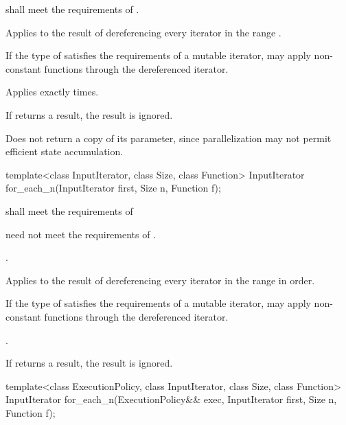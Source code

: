 \begin{itemdescr}
\pnum
\requires
{} shall meet the requirements of .

\pnum
\effects
Applies  to the result of dereferencing every iterator in the range
.
\begin{note}
If the type of  satisfies the requirements of a mutable iterator,
 may apply non-constant functions through the dereferenced iterator.
\end{note}

\pnum
\complexity
Applies  exactly  times.

\pnum
\remarks
If  returns a result, the result is ignored.

\pnum
\realnotes Does not return a copy of its  parameter, since
parallelization may not permit efficient state accumulation.
\end{itemdescr}

%
\begin{itemdecl}
template<class InputIterator, class Size, class Function>
  InputIterator for_each_n(InputIterator first, Size n, Function f);
\end{itemdecl}

\begin{itemdescr}
\pnum
\requires
{} shall meet the requirements of 
\begin{note}  need not meet the requirements of
. \end{note}

\pnum
\requires
{}.

\pnum
\effects
Applies  to the result of dereferencing every iterator in the range
 in order.
\begin{note}
If the type of  satisfies the requirements of a mutable iterator,
 may apply non-constant functions through the dereferenced iterator.
\end{note}

\pnum
\returns
{}.

\pnum
\remarks
If  returns a result, the result is ignored.
\end{itemdescr}

%
\begin{itemdecl}
template<class ExecutionPolicy, class InputIterator, class Size, class Function>
  InputIterator for_each_n(ExecutionPolicy&& exec, InputIterator first, Size n,
                           Function f);
\end{itemdecl}

